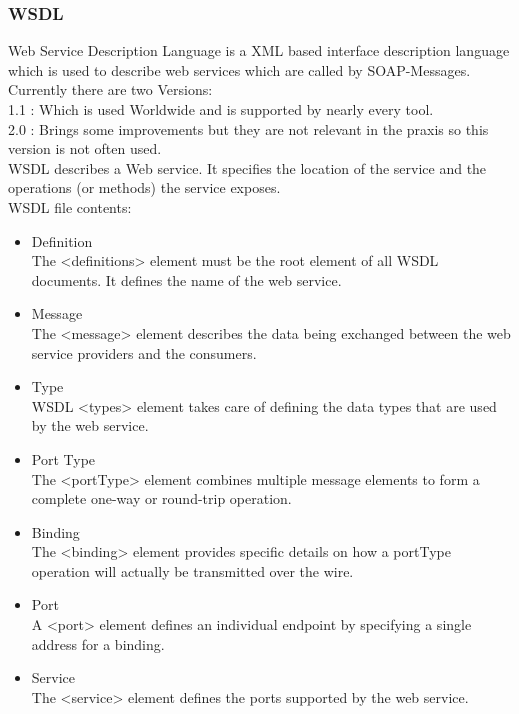 \documentclass[12pt]{article}
\begin{document}
	
\subsubsection{WSDL}
Web Service Description Language is a XML based interface description language
which is used to describe web services which are called by SOAP-Messages.
Currently there are two Versions:\\
1.1 : Which is used Worldwide and is supported by nearly every tool. \\
2.0 : Brings some improvements but they are not relevant in the praxis so this version is not often
used.\\
WSDL describes a Web service. It specifies the location of the service and the operations (or methods) the service exposes.\\

WSDL file contents:
\begin{itemize}
\item Definition \\
The <definitions> element must be the root element of all WSDL documents. It defines the name of the web service.
\item Message \\
The <message> element describes the data being exchanged between the web service providers and the consumers.
\item Type \\
WSDL <types> element takes care of defining the data types that are used by the web service.
\item Port Type  \\
The <portType> element combines multiple message elements to form a complete one-way or round-trip operation.
\item Binding \\
The <binding> element provides specific details on how a portType operation will actually be transmitted over the wire.
\item Port \\
A <port> element defines an individual endpoint by specifying a single address for a binding. 
\item Service \\
The <service> element defines the ports supported by the web service.
\end{itemize}
\cite{wsdl}\newpage
\end{document}

